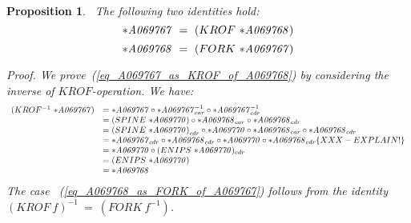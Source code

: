 \documentclass[11pt]{article} %
\newtheorem{propo}{Proposition}
\newcommand{\eqn}[1]{(\ref{#1})}
\newcommand{\eeq}{\end{equation}}
\newcommand{\beql}[1]{\begin{equation}\label{#1}}
\newcommand{\autname}[1]{{\it *#1}}
\newcommand{\funapply}{\ensuremath{\circ}}
\begin{document}

\

\begin{propo}~\label{propo_A069767_as_KROF_of_A069768}
\normalfont
The following two identities hold:
\beql{eq_A069767_as_KROF_of_A069768}
\autname{A069767}~=~(KROF~\autname{A069768})
\eeq
\beql{eq_A069768_as_FORK_of_A069767}
\autname{A069768}~=~(FORK~\autname{A069767})
\eeq

\textit{Proof}.
We prove~\eqn{eq_A069767_as_KROF_of_A069768} by considering the inverse
of $KROF$-operation. We have:
\beql{proof_of_A069767_as_KROF_of_A069768}
\begin{array}{l l}
(KROF^{-1}~\autname{A069767}) & = \autname{A069767} \funapply \autname{A069767}^{-1}_{car} \funapply \autname{A069767}^{-1}_{cdr} \\
     & = (SPINE~\autname{A069770}) \funapply \autname{A069768}_{car} \funapply \autname{A069768}_{cdr} \\
     & = {(SPINE~\autname{A069770})}_{cdr} \funapply \autname{A069770} \funapply \autname{A069768}_{car} \funapply \autname{A069768}_{cdr} \\
     & = \autname{A069767}_{cdr} \funapply \autname{A069768}_{cdr} \funapply \autname{A069770} \funapply \autname{A069768}_{cdr} \{ XXX - EXPLAIN! \}\\
     & = \autname{A069770} \funapply (ENIPS~\autname{A069770})_{cdr} \\ %
     & = (ENIPS~\autname{A069770}) \\
     & = \autname{A069768} \\
\end{array}
\eeq
The case ~\eqn{eq_A069768_as_FORK_of_A069767} follows from the identity
$(KROF~f)^{-1}~=~(FORK~f^{-1})$.
\end{propo}
\end{document}
